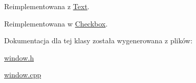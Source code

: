 Reimplementowana z \hyperlink{classText_ab334ff82f41302f83bebf3eaf2516a84}{Text}.



Reimplementowana w \hyperlink{classCheckbox_afd75946a43da1dcba8e6f04f00df34ee}{Checkbox}.



Dokumentacja dla tej klasy została wygenerowana z plików\+:\begin{DoxyCompactItemize}
\item 
\hyperlink{window_8h}{window.\+h}\item 
\hyperlink{window_8cpp}{window.\+cpp}\end{DoxyCompactItemize}
